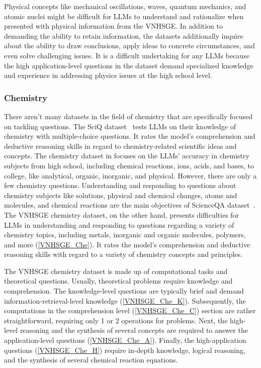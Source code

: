 \documentclass{article}
\begin{document}
{	Physical concepts like mechanical oscillations, waves, quantum mechanics, and atomic nuclei might be difficult for LLMs to understand and rationalize when presented with physical information from the VNHSGE. In addition to demanding the ability to retain information, the datasets additionally inquire about the ability to draw conclusions, apply ideas to concrete circumstances, and even solve challenging issues. It is a difficult undertaking for any LLMs because the high application-level questions in the dataset demand specialized knowledge and experience in addressing physics issues at the high school level.
	
	\subsubsection{Chemistry}
	
	There aren't many datasets in the field of chemistry that are specifically focused on tackling questions. The SciQ dataset~\cite{welbl2017crowdsourcing} tests LLMs on their knowledge of chemistry with multiple-choice questions. It rates the model's comprehension and deductive reasoning skills in regard to chemistry-related scientific ideas and concepts. The chemistry dataset in \cite{hendrycks2020measuring} focuses on the LLMs' accuracy in chemistry subjects from high school, including chemical reactions, ions, acids, and bases, to college, like analytical, organic, inorganic, and physical. However, there are only a few chemistry questions. Understanding and responding to questions about chemistry subjects like solutions, physical and chemical changes, atoms and molecules, and chemical reactions are the main objectives of ScienceQA dataset~\cite{lu2022learn}. The VNHSGE chemistry dataset, on the other hand, presents difficulties for LLMs in understanding and responding to questions regarding a variety of chemistry topics, including metals, inorganic and organic molecules, polymers, and more (\ref{VNHSGE_Che}). It rates the model's comprehension and deductive reasoning skills with regard to a variety of chemistry concepts and principles.
	
	The VNHSGE chemistry dataset is made up of  computational tasks and  theoretical questions. Usually, theoretical problems require knowledge and comprehension. The knowledge-level questions are typically brief and demand information-retrieval-level knowledge (\ref{VNHSGE_Che_K}). Subsequently, the computations in the comprehension level (\ref{VNHSGE_Che_C}) section are rather straightforward, requiring only 1 or 2 operations for problems. Next, the high-level reasoning and the synthesis of several concepts are required to answer the application-level questions (\ref{VNHSGE_Che_A}). Finally, the high-application questions (\ref{VNHSGE_Che_H}) require in-depth knowledge, logical reasoning, and the synthesis of several chemical reaction equations.
	
}
\end{document}
